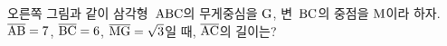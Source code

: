\noindent\begin{minipage}[t]{0.58\linewidth}\vspace{0pt}\raggedright 오른쪽 그림과 같이 삼각형~$\mathrm{ABC}$의 무게중심을 $\mathrm{G}$, 변~$\mathrm{BC}$의 중점을 $\mathrm{M}$이라 하자. $\overline{\mathrm{AB}}=7$, $\overline{\mathrm{BC}}=6$, $\overline{\mathrm{MG}}=\sqrt{3}$일 때, $\overline{\mathrm{AC}}$의 길이는?\end{minipage}\hfill\begin{minipage}[t]{0.4\linewidth}\vspace{0pt}\centering \resizebox{\ifdim\width>\linewidth\linewidth\else\width\fi}{!}{}\end{minipage}\par
{}

